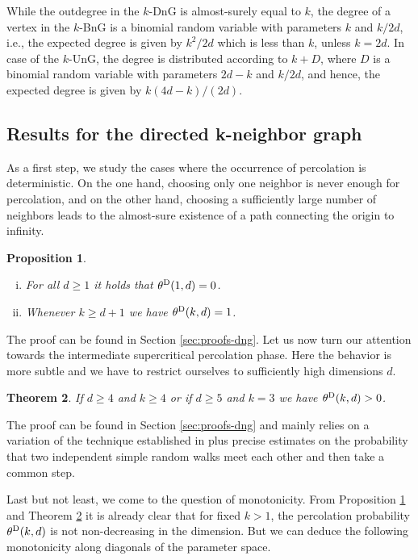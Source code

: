 \documentclass[a4paper, oneside, 11pt]{amsart}
\newtheorem{theorem}{Theorem}[section]
\newtheorem{prop}[theorem]{Proposition}
\theoremstyle{definition}
\newcommand{\1}{\mathbbm{1}}
\newcommand{\0}{\mathbf{o}}
\numberwithin{equation}{section}
\begin{document}
While the outdegree in the $k$-DnG is almost-surely equal to $k$,  the degree of a vertex in the $k$-BnG is a binomial random variable with parameters $k$ and $k/2d$, i.e., the expected degree is given by $k^2/2d$ which is less than $k$, unless $k=2d$. In case of the $k$-UnG, the degree is distributed according to $k+D$, where $D$ is a binomial random variable with parameters $2d-k$ and $k/2d$, and hence, the expected degree is given by $k(4d-k)/(2d)$.

\subsection{Results for the directed k-neighbor graph}
As a first step, we study the cases where the occurrence of percolation is deterministic. On the one hand, choosing only one neighbor is never enough for percolation, and on the other hand, choosing a sufficiently large number of neighbors leads to the almost-sure existence of a path connecting the origin to infinity. 

\begin{prop}\label{prop:deterministic-percolation-dng}
    \begin{enumerate}[(i)]
        \item For all $d \geq 1$ it holds that $\theta^{\rm D}(1,d) = 0$.
        \item Whenever $k \geq d+1$ we have $\theta^{\rm D}(k,d) = 1$. 
    \end{enumerate}
\end{prop}

The proof can be found in Section \ref{sec:proofs-dng}. Let us now turn our attention towards the intermediate supercritical percolation phase. Here the behavior is more subtle and we have to restrict ourselves to sufficiently high dimensions $d$. 

\begin{theorem}\label{thm-CoxDurrett}
    If $d \geq 4$ and $k \geq 4$ or if $d \geq 5$ and $k = 3$ we have $\theta^{\rm D}(k,d)>0$. 
\end{theorem}
The proof can be found in  Section \ref{sec:proofs-dng} and mainly relies on a variation of the technique established in \cite{CoxDurrett} plus precise estimates on the probability that two independent simple random walks meet each other and then take a common step. 

Last but not least, we come to the question of monotonicity. From Proposition \ref{prop:deterministic-percolation-dng} and Theorem \ref{thm-CoxDurrett} it is already clear that for fixed $k>1$, the percolation probability $\theta^{\rm D}(k,d)$ is not non-decreasing in the dimension. But we can deduce the following monotonicity along diagonals of the parameter space. 
\end{document}
